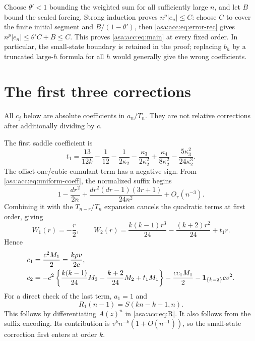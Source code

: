 \documentclass[11pt,letterpaper]{article}
\theoremstyle{remark}\newtheorem{remark}[theorem]{Remark}
\numberwithin{equation}{section}
\newcommand{\ind}{\mathbf 1}\newcommand{\fall}[2]{(#1)_{\underline{#2}}}
\begin{document}
Choose $\theta'<1$ bounding the weighted sum for all sufficiently large $n$, and let $B$ bound the scaled forcing. Strong induction proves $n^p|e_n|\le C$: choose $C$ to cover the finite initial segment and $B/(1-\theta')$, then \eqref{asa:acc:eq:error-rec} gives $n^p|e_n|\le\theta'C+B\le C$. This proves \eqref{asa:acc:eq:main} at every fixed order. In particular, the small-state boundary is retained in the proof; replacing $b_h$ by a truncated large-$h$ formula for all $h$ would generally give the wrong coefficients.

\section{The first three corrections}\label{asa:acc:sec:corrections}
All $c_j$ below are absolute coefficients in $a_n/T_n$. They are not relative corrections after additionally dividing by $c$.

The first saddle coefficient is
\begin{equation}\label{asa:acc:eq:t1}
t_1=\frac{13}{12k}-\frac1{12}-\frac1{2\kappa_2}
-\frac{\kappa_3}{2\kappa_2^2}
+\frac{\kappa_4}{8\kappa_2^2}
-\frac{5\kappa_3^2}{24\kappa_2^3}.
\end{equation}
The offset-one/cubic-cumulant term has a negative sign. From \eqref{asa:acc:eq:uniform-coeff}, the normalized suffix begins
\[
1-\frac{dr^2}{2n}
+\frac{dr^2(dr-1)(3r+1)}{24n^2}+O_r(n^{-3}).
\]
Combining it with the $T_{n-r}/T_n$ expansion cancels the quadratic terms at first order, giving
\begin{equation}\label{asa:acc:eq:W12}
W_1(r)=-\frac r2,\qquad
W_2(r)=\frac{k(k-1)r^3}{24}-\frac{(k+2)r^2}{24}+t_1r.
\end{equation}
Hence
\begin{align}
c_1&=\frac{c^2M_1}{2}=\frac{k\rho v}{2c},\notag\\
c_2&=-c^2\left\{\frac{k(k-1)}{24}M_3-\frac{k+2}{24}M_2+t_1M_1\right\}
-\frac{cc_1M_1}{2}-\ind_{\{k=2\}}cv^2.\label{asa:acc:eq:c2}
\end{align}
For a direct check of the last term, $a_1=1$ and
\begin{equation}\label{asa:acc:eq:h1-exact}
R_1(n-1)=S(kn-k+1,n).
\end{equation}
This follows by differentiating $A(z)^n$ in \eqref{asa:acc:eq:R}. It also follows from the suffix encoding. Its contribution is $v^kn^{-k}(1+O(n^{-1}))$, so the small-state correction first enters at order $k$.
\end{document}
